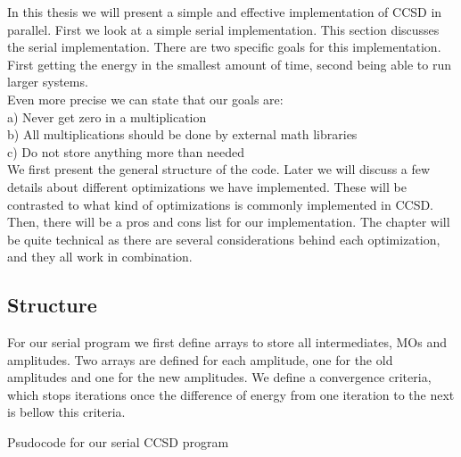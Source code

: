 \documentclass[a4paper,norsk,11pt,twoside]{report}
\begin{document}
In this thesis we will present a simple and effective implementation
of CCSD in parallel. First we look at a simple serial
implementation. This section discusses the serial
implementation. There are two specific goals for this
implementation. First getting the energy in the smallest amount of
time, second being able to run larger systems. \\

Even more precise we can state that our goals are: \\
a) Never get zero in a multiplication\\
b) All multiplications should be done by external math libraries\\
c) Do not store anything more than needed\\

We first present the general structure of the code. Later we will
discuss a few details about different optimizations we have
implemented. These will be contrasted to what kind of optimizations is
commonly implemented in CCSD. Then, there will be a pros and cons list
for our implementation. The chapter will be quite technical as there
are several considerations behind each optimization, and they all work
in combination.

\subsection{Structure}

For our serial program we first define arrays to store all
intermediates, MOs and amplitudes. Two arrays are defined for each
amplitude, one for the old amplitudes and one for the new
amplitudes. We define a convergence criteria, which stops iterations
once the difference of energy from one iteration to the next is bellow
this criteria. \\

\begin{algorithm}[H]
 \caption{Psudocode for our serial CCSD program}
 \label{CCSD_STRUCTURE_SERIAL}
\end{algorithm}
\end{document}
